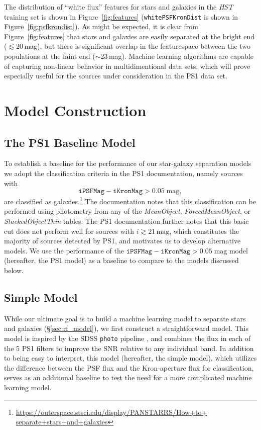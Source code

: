 \documentclass[twocolumn, dvipdfmx]{aastex62}
\begin{document}
The distribution of ``white flux'' features for stars and galaxies in the
\textit{HST} training set is shown in Figure~\ref{fig:features}
(\texttt{whitePSFKronDist} is shown in Figure~\ref{fig:psfkrondist}). As
might be expected, it is clear from Figure~\ref{fig:features} that stars and
galaxies are easily separated at the bright end ($\lesssim 20$\,mag), but
there is significant overlap in the featurespace between the two populations
at the faint end ($\sim$23\,mag). Machine learning algorithms are capable of
capturing non-linear behavior in multidimentional data sets, which will
prove especially useful for the sources under consideration in the PS1 data
set.

\section{Model Construction}
\subsection{The PS1 Baseline Model}\label{sec:ps1_model}

To establish a baseline for the performance of our star-galaxy separation
models we adopt the classification criteria in the PS1 documentation, namely
sources with 
%
$$ \mathtt{iPSFMag} - \mathtt{iKronMag} > 0.05\;\mathrm{mag},$$
%
are classified as
galaxies.\footnote{\url{https://outerspace.stsci.edu/display/PANSTARRS/How+to+
separate+stars+and+galaxies}} The documentation notes that this
classification can be performed using photometry from any of the
\textit{MeanObject}, \textit{ForcedMeanObject}, or \textit{StackedObjectThin}
tables. The PS1 documentation further notes that this basic cut does not
perform well for sources with $i \gtrsim 21\,\mathrm{mag}$, which constitutes
the majority of sources detected by PS1, and motivates us to develop
alternative models. We use the performance of the $\mathtt{iPSFMag} -
\mathtt{iKronMag} > 0.05\;\mathrm{mag}$ model (hereafter, the PS1 model) as a
baseline to compare to the models discussed below.

\subsection{Simple Model}\label{sec:simple_model}

While our ultimate goal is to build a machine learning model to separate
stars and galaxies (\S\ref{sec:rf_model}), we first construct a
straightforward model. This model is inspired by the SDSS \texttt{photo}
pipeline \citep{Lupton01}, and combines the flux in each of the 5 PS1 filters
to improve the SNR relative to any individual band. In addition to being easy
to interpret, this model (hereafter, the simple model), which utilizes the
difference between the PSF flux and the Kron-aperture flux for
classification, serves as an additional baseline to test the need for a more
complicated machine learning model.
\end{document}

